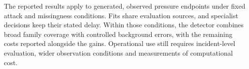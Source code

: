 The reported results apply to generated, observed pressure endpoints under fixed attack and missingness conditions. Fits share evaluation sources, and specialist decisions keep their stated delay. Within those conditions, the detector combines broad family coverage with controlled background errors, with the remaining costs reported alongside the gains. Operational use still requires incident-level evaluation, wider observation conditions and measurements of computational cost.
